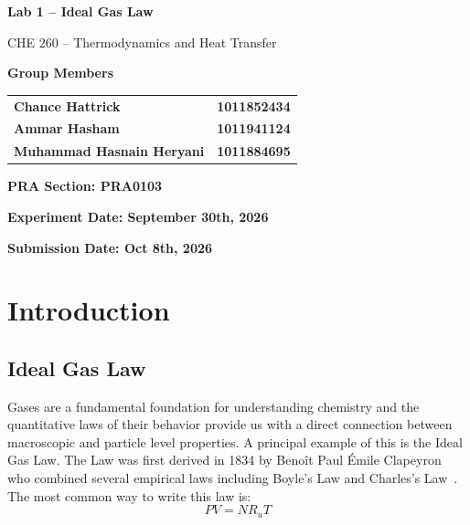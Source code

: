 \documentclass[12pt,letterpaper]{article}
\begin{document}
\hypersetup{pageanchor=false}
\begin{titlepage}
    \centering
    \vspace*{1.5cm}
    {\Large\bfseries Lab 1 -- Ideal Gas Law\par}
    \vspace{0.5cm}
    {\large CHE 260 -- Thermodynamics and Heat Transfer\par}
    \vspace{1.5cm}

    \textbf{Group Members}\par
    \begin{tabular}{@{}p{}p{}@{}}
        \textbf{Chance Hattrick} & \textbf{1011852434} \\
        \textbf{Ammar Hasham} & \textbf{1011941124} \\
        \textbf{Muhammad Hasnain Heryani} & \textbf{1011884695} \\
    \end{tabular}

    \vspace{1cm}
    \textbf{PRA Section: PRA0103}\par
    \textbf{Experiment Date: September 30th, 2026}\par
    \textbf{Submission Date: Oct 8th, 2026}\par
    \vfill
\end{titlepage}
\hypersetup{pageanchor=true}
\twocolumn
\raggedbottom
\setlength{\emergencystretch}{2em}
\setlength{\abovedisplayskip}{6pt}
\setlength{\belowdisplayskip}{6pt}
\setlength{\abovedisplayshortskip}{4pt}
\setlength{\belowdisplayshortskip}{6pt}
\setlength{\jot}{6pt}
\setlength{\intextsep}{10pt}
\setlength{\textfloatsep}{10pt}
\setlength{\floatsep}{10pt}
\makeatletter
\setlength{\@fptop}{0pt}
\setlength{\@fpsep}{12pt}
\setlength{\@fpbot}{0pt plus 1fil}
\makeatother

\section{Introduction}

\subsection{Ideal Gas Law}

Gases are a fundamental foundation for understanding chemistry
and the quantitative laws of their behavior provide us with a
direct connection between macroscopic and particle level
properties. A principal example of this is the Ideal Gas Law.
The Law was first derived in 1834 by Benoît Paul Émile Clapeyron
who combined several empirical laws including Boyle's Law and
Charles's Law~\cite{clapeyron1834}. The most common way to write this law is:
\begin{equation}
    PV = NR_uT
\end{equation}
\end{document}
